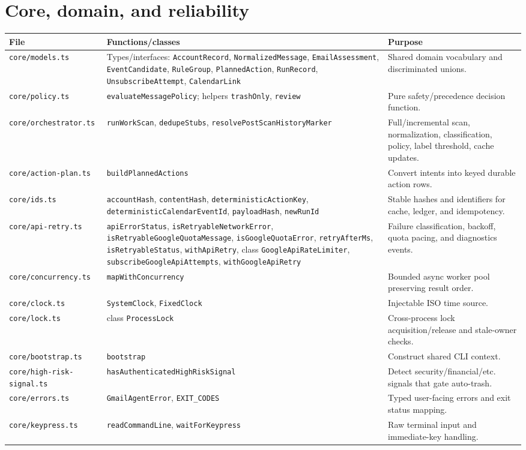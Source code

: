 \documentclass[12pt,oneside]{book}
\newcommand{\code}[1]{\nolinkurl{#1}}
\newcommand{\file}[1]{\nolinkurl{#1}}
\begin{document}
\section{Core, domain, and reliability}

\begingroup\scriptsize
\begin{longtable}{P{3.6cm}P{5.8cm}P{7.0cm}}
\toprule
\textbf{File} & \textbf{Functions/classes} & \textbf{Purpose} \\
\midrule
\endhead
\file{core/models.ts} & Types/interfaces: \code{AccountRecord}, \code{NormalizedMessage}, \code{EmailAssessment}, \code{EventCandidate}, \code{RuleGroup}, \code{PlannedAction}, \code{RunRecord}, \code{UnsubscribeAttempt}, \code{CalendarLink} & Shared domain vocabulary and discriminated unions. \\
\file{core/policy.ts} & \code{evaluateMessagePolicy}; helpers \code{trashOnly}, \code{review} & Pure safety/precedence decision function. \\
\file{core/orchestrator.ts} & \code{runWorkScan}, \code{dedupeStubs}, \code{resolvePostScanHistoryMarker} & Full/incremental scan, normalization, classification, policy, label threshold, cache updates. \\
\file{core/action-plan.ts} & \code{buildPlannedActions} & Convert intents into keyed durable action rows. \\
\file{core/ids.ts} & \code{accountHash}, \code{contentHash}, \code{deterministicActionKey}, \code{deterministicCalendarEventId}, \code{payloadHash}, \code{newRunId} & Stable hashes and identifiers for cache, ledger, and idempotency. \\
\file{core/api-retry.ts} & \code{apiErrorStatus}, \code{isRetryableNetworkError}, \code{isRetryableGoogleQuotaMessage}, \code{isGoogleQuotaError}, \code{retryAfterMs}, \code{isRetryableStatus}, \code{withApiRetry}, class \code{GoogleApiRateLimiter}, \code{subscribeGoogleApiAttempts}, \code{withGoogleApiRetry} & Failure classification, backoff, quota pacing, and diagnostics events. \\
\file{core/concurrency.ts} & \code{mapWithConcurrency} & Bounded async worker pool preserving result order. \\
\file{core/clock.ts} & \code{SystemClock}, \code{FixedClock} & Injectable ISO time source. \\
\file{core/lock.ts} & class \code{ProcessLock} & Cross-process lock acquisition/release and stale-owner checks. \\
\file{core/bootstrap.ts} & \code{bootstrap} & Construct shared CLI context. \\
\file{core/high-risk-signal.ts} & \code{hasAuthenticatedHighRiskSignal} & Detect security/financial/etc. signals that gate auto-trash. \\
\file{core/errors.ts} & \code{GmailAgentError}, \code{EXIT_CODES} & Typed user-facing errors and exit status mapping. \\
\file{core/keypress.ts} & \code{readCommandLine}, \code{waitForKeypress} & Raw terminal input and immediate-key handling. \\
\bottomrule
\end{longtable}
\endgroup
\end{document}
